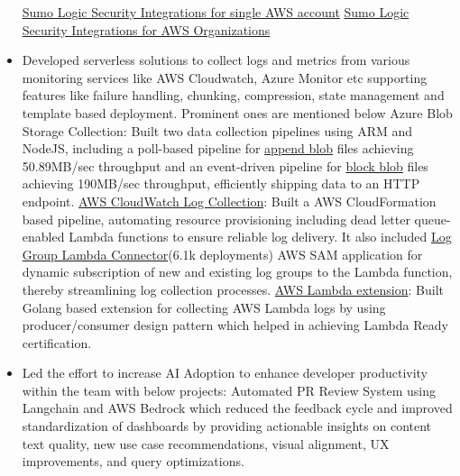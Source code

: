 \documentclass[margin,line]{resume}
\begin{document}
\begin{resume}
\begin{itemize}
            \subitem \href{https://aws-ia.github.io/cfn-ps-sumo-logic-log-centralization/}{Sumo Logic Security Integrations for single AWS account}
            \subitem \href{https://aws-ia.github.io/cfn-ps-sumo-logic-cloudsiem/}{Sumo Logic Security Integrations for AWS Organizations}
            \item Developed serverless solutions to collect logs and metrics from various monitoring services like AWS Cloudwatch, Azure Monitor etc supporting features like failure handling, chunking, compression, state management and template based deployment. Prominent ones are mentioned below
            \subitem Azure Blob Storage Collection: Built two data collection pipelines using ARM and NodeJS, including a poll-based pipeline for \href{https://help.sumologic.com/docs/send-data/collect-from-other-data-sources/azure-blob-storage/append-blob}{append blob} files achieving 50.89MB/sec throughput and an event-driven pipeline for \href{https://help.sumologic.com/docs/send-data/collect-from-other-data-sources/azure-blob-storage/block-blob}{block blob} files achieving 190MB/sec throughput, efficiently shipping data to an HTTP endpoint.
            \pagebreak
            \subitem \href{https://help.sumologic.com/Send-Data/Collect-from-Other-Data-Sources/Amazon-CloudWatch-Logs}{AWS CloudWatch Log Collection}: Built a AWS CloudFormation based pipeline, automating resource provisioning including dead letter queue-enabled Lambda functions to ensure reliable log delivery. It also included \href{https://serverlessrepo.aws.amazon.com/applications/us-east-1/956882708938/sumologic-loggroup-connector}{Log Group Lambda Connector}(6.1k deployments) AWS SAM application for dynamic subscription of new and existing log groups to the Lambda function, thereby streamlining log collection processes.
            \subitem \href{https://github.com/SumoLogic/sumologic-lambda-extensions}{AWS Lambda extension}: Built Golang based extension for collecting AWS Lambda logs by using producer/consumer design pattern which helped in achieving Lambda Ready certification.
            \item Led the effort to increase AI Adoption to enhance developer productivity within the team with below projects:
                \subitem Automated PR Review System using Langchain and AWS Bedrock which reduced the feedback cycle and improved standardization of dashboards by providing actionable insights on content text quality, new use case recommendations, visual alignment, UX improvements, and query optimizations.

\end{itemize}
\end{resume}
\end{document}
